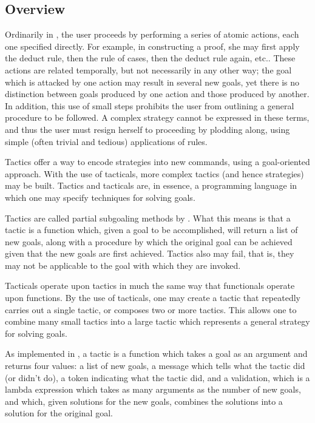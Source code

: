 


\subsection{Overview}

Ordinarily in {\TPS}, the user proceeds by performing a series of
atomic actions, each one specified directly.  For example, in constructing
a proof, she may first apply the deduct rule, then the rule of cases, then
the deduct rule again, etc..  These actions are related temporally, but
not necessarily in any other way; the goal which is attacked by
one action may result in several new goals, yet there is no distinction
between goals produced by one action and those produced by another.
In addition, this use of small steps prohibits the user from outlining
a general procedure
to be followed.  A complex strategy cannot be expressed in these terms,
and thus
the user must resign herself to proceeding by plodding along, using simple
(often trivial and tedious) applications of rules.

Tactics offer a way to encode strategies into new commands, using a
goal-oriented approach.  With the use of tacticals, more complex tactics
(and hence strategies) may be built.  Tactics and tacticals are, in essence,
a programming language in which one may specify techniques for solving
goals.

Tactics are called  partial subgoaling methods by
\cite{GORDON79}.  What this means is that a tactic is a
function which, given a goal to be accomplished,
will return a list of new goals, along with a procedure by which the
original goal can be achieved given that the new goals are first
achieved.  Tactics also may fail, that is, they may not be applicable
to the goal with which they are invoked.

Tacticals operate upon tactics in much the same way that functionals
operate upon functions.  By the use of tacticals, one may create
a tactic that repeatedly carries out a single tactic, or composes
two or more tactics.  This allows one to combine many small tactics
into a large tactic which represents a general strategy for solving goals.

As implemented in {\TPS}, a tactic is a function which takes a goal
as an argument and returns four values: a list of new goals, a message
which tells what the tactic did (or didn't do), a token indicating what
the tactic did, and a validation, which is a lambda expression which takes
as many arguments as the number of new goals, and which, given solutions
for the new goals, combines the solutions into a solution for the original
goal.

